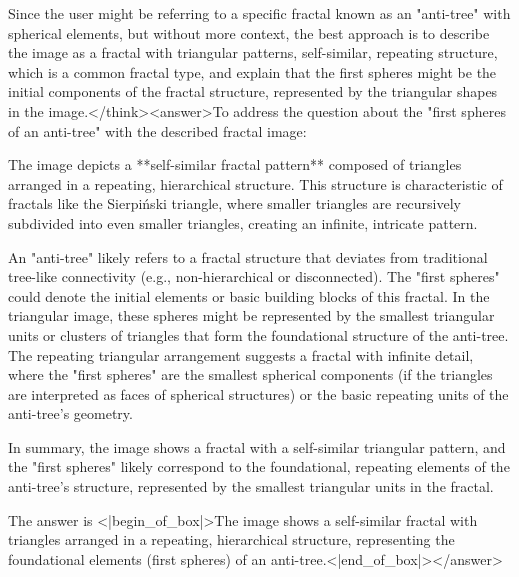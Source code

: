 Since the user might be referring to a specific fractal known as an "anti-tree" with spherical elements, but without more context, the best approach is to describe the image as a fractal with triangular patterns, self-similar, repeating structure, which is a common fractal type, and explain that the first spheres might be the initial components of the fractal structure, represented by the triangular shapes in the image.</think><answer>To address the question about the "first spheres of an anti-tree" with the described fractal image:  

The image depicts a **self-similar fractal pattern** composed of triangles arranged in a repeating, hierarchical structure. This structure is characteristic of fractals like the Sierpiński triangle, where smaller triangles are recursively subdivided into even smaller triangles, creating an infinite, intricate pattern.  

An "anti-tree" likely refers to a fractal structure that deviates from traditional tree-like connectivity (e.g., non-hierarchical or disconnected). The "first spheres" could denote the initial elements or basic building blocks of this fractal. In the triangular image, these spheres might be represented by the smallest triangular units or clusters of triangles that form the foundational structure of the anti-tree. The repeating triangular arrangement suggests a fractal with infinite detail, where the "first spheres" are the smallest spherical components (if the triangles are interpreted as faces of spherical structures) or the basic repeating units of the anti-tree’s geometry.  

In summary, the image shows a fractal with a self-similar triangular pattern, and the "first spheres" likely correspond to the foundational, repeating elements of the anti-tree’s structure, represented by the smallest triangular units in the fractal.  

The answer is <|begin_of_box|>The image shows a self-similar fractal with triangles arranged in a repeating, hierarchical structure, representing the foundational elements (first spheres) of an anti-tree.<|end_of_box|></answer>